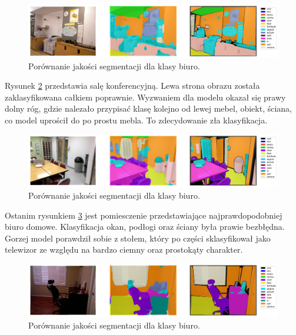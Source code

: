 \begin{figure}[ht!]
    \centering
    \includegraphics[width=\textwidth]{img/preds_analysis/gt_vs_pred/office-1.png}
    \caption{Porównanie jakości segmentacji dla klasy biuro.}
    \label{fig:office-pred-1}
\end{figure}

Rysunek \ref{fig:office-pred-2} przedstawia salę konferencyjną. Lewa strona obrazu została zaklasyfikowana całkiem poprawnie. Wyzwaniem dla modelu okazał się prawy dolny róg, gdzie nalezało przypisać klasę kolejno od lewej mebel, obiekt, ściana, co model uprościł do po prostu mebla. To zdecydowanie zła klasyfikacja.

\begin{figure}[ht!]
    \centering
    \includegraphics[width=\textwidth]{img/preds_analysis/gt_vs_pred/office-2.png}
    \caption{Porównanie jakości segmentacji dla klasy biuro.}
    \label{fig:office-pred-2}
\end{figure}

Ostanim rysunkiem {\ref{fig:office-pred-3}} jest pomiesczenie przedstawiające najprawdopodobniej biuro domowe. Klasyfikacja okan, podłogi oraz ściany była prawie bezbłędna. Gorzej model porawdził sobie z stołem, który po części sklasyfikował jako telewizor ze względu na bardzo ciemny oraz prostokąty charakter.

\begin{figure}[ht!]
    \centering
    \includegraphics[width=\textwidth]{img/preds_analysis/gt_vs_pred/office-3.png}
    \caption{Porównanie jakości segmentacji dla klasy biuro.}
    \label{fig:office-pred-3}
\end{figure}

